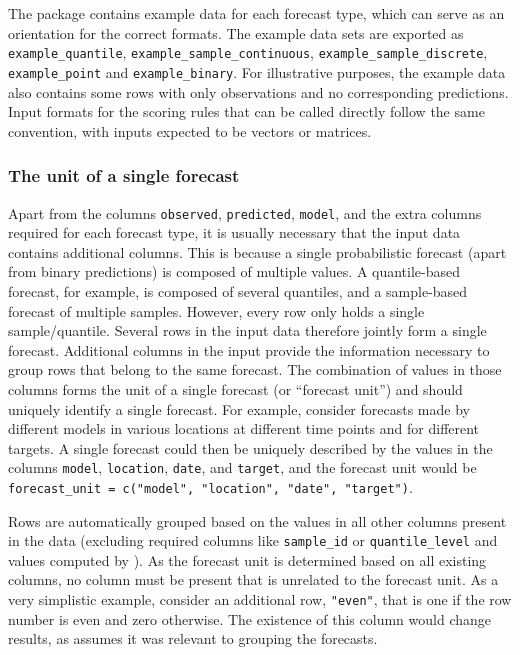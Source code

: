 \documentclass[
]{jss}
\begin{document}
The package contains example data for each forecast type, which can
serve as an orientation for the correct formats. The example data sets
are exported as \texttt{example\_quantile},
\texttt{example\_sample\_continuous},
\texttt{example\_sample\_discrete}, \texttt{example\_point} and
\texttt{example\_binary}. For illustrative purposes, the example data
also contains some rows with only observations and no corresponding
predictions. Input formats for the scoring rules that can be called
directly follow the same convention, with inputs expected to be vectors
or matrices.

\subsubsection{The unit of a single
forecast}\label{the-unit-of-a-single-forecast}

Apart from the columns \texttt{observed}, \texttt{predicted},
\texttt{model}, and the extra columns required for each forecast type,
it is usually necessary that the input data contains additional columns.
This is because a single probabilistic forecast (apart from binary
predictions) is composed of multiple values. A quantile-based forecast,
for example, is composed of several quantiles, and a sample-based
forecast of multiple samples. However, every row only holds a single
sample/quantile. Several rows in the input data therefore jointly form a
single forecast. Additional columns in the input provide the information
necessary to group rows that belong to the same forecast. The
combination of values in those columns forms the unit of a single
forecast (or ``forecast unit'') and should uniquely identify a single
forecast. For example, consider forecasts made by different models in
various locations at different time points and for different targets. A
single forecast could then be uniquely described by the values in the
columns \texttt{model}, \texttt{location}, \texttt{date}, and
\texttt{target}, and the forecast unit would be
\texttt{forecast\_unit\ =\ c("model",\ "location",\ "date",\ "target")}.

Rows are automatically grouped based on the values in all other columns
present in the data (excluding required columns like \texttt{sample\_id}
or \texttt{quantile\_level} and values computed by ).
As the forecast unit is determined based on all existing columns, no
column must be present that is unrelated to the forecast unit. As a very
simplistic example, consider an additional row, \texttt{"even"}, that is
one if the row number is even and zero otherwise. The existence of this
column would change results, as  assumes it was
relevant to grouping the forecasts.
\end{document}
